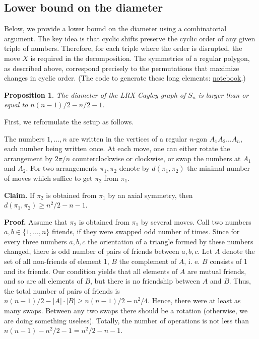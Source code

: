 \documentclass[reqno,11pt]{amsart}
\newtheorem{proposition}[Def]{Proposition}
\begin{document}


\subsection{Lower bound on the diameter}
Below, we provide a lower bound on the diameter using a combinatorial argument. The key idea is that cyclic shifts preserve the cyclic order of any given triple of numbers. Therefore, for each triple where the order is disrupted, the move $X$ is required in the decomposition.   The symmetries of a regular polygon, as described above, correspond precisely to the permutations that maximize changes in cyclic order. (The code to generate these long elements: \href{https://www.kaggle.com/code/alexandervc/lrx-long-elements-2-f-petrov-oeisa186752}{notebook}.) 

\begin{proposition}
    The diameter of the LRX Cayley graph of $S_n$ is larger than or equal to $n(n-1)/2-n/2-1$.
\end{proposition}

First, we reformulate the setup as follows.

The numbers $1,\ldots,n$  are written in the vertices of a regular $n$-gon $A_1A_2\ldots A_n$, each number being written once. At each move, one can either rotate the arrangement by $2\pi/n$  counterclockwise or clockwise, or swap the numbers at $A_1$ and $A_2$.
For two arrangements $\pi_1,\pi_2$ denote by $d(\pi_1,\pi_2)$ the minimal number of moves which suffice to get $\pi_2$ from $\pi_1$.

\textbf{Claim.} If $\pi_2$ is obtained from $\pi_1$ by an axial symmetry, then $d(\pi_1,\pi_2)\geqslant n^2/2-n-1$.

\textbf{Proof.} Assume that $\pi_2$ is obtained from $\pi_1$ by several moves. Call two numbers $a, b\in \{1,\ldots,n\}$ friends, if they were swapped odd number of times. Since for every three numbers $a, b, c$ the orientation of a triangle formed by these numbers changed, there is odd number of pairs of friends between $a, b, c$. Let $A$ denote the set of all non-friends of element 1, $B$ the complement  of $A$, i. e. $B$ consists of 1 and its friends. Our condition yields that all elements of $A$ are mutual friends, and so are all elements of $B$, but there is no friendship between $A$ and $B$. Thus, the total number of pairs of friends is $n(n-1)/2-|A|\cdot |B|\geqslant n(n-1)/2-n^2/4$. Hence, there were at least as many swaps. Between any two swaps there should be a rotation (otherwise, we are doing something useless). Totally, the number of operations is not less than $n(n-1)-n^2/2-1=n^2/2-n-1$.
\end{document}
